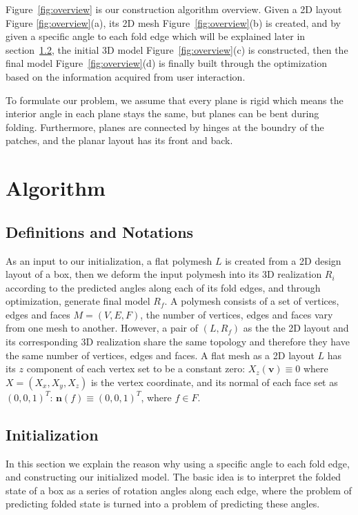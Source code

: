 \documentclass[submission]{gmp2018}
\begin{document}
Figure~\ref{fig:overview} is our construction algorithm overview. Given a 2D layout Figure \ref{fig:overview}(a), its 2D mesh Figure~\ref{fig:overview}(b) is created, and by given a specific angle to each fold edge which will be explained later in section~\ref{sec:initialization}, the initial 3D model Figure~\ref{fig:overview}(c) is constructed, then the final model Figure~\ref{fig:overview}(d) is finally built through the optimization based on the information acquired from user interaction.

To formulate our problem, we assume that every plane is rigid which means the interior angle in each plane stays the same, but planes can be bent during folding. Furthermore, planes are connected by hinges at the boundry of the patches, and the planar layout has its front and back.


\section{Algorithm}\label{sec:optimization}
\subsection{Definitions and Notations}
As an input to our initialization, a flat polymesh $L$ is created from a 2D design layout of a box, then we deform the input polymesh into its 3D realization $R_i$ according to the predicted angles along each of its fold edges, and through optimization, generate final model $R_f$. A polymesh consists of a set of vertices, edges and faces $M = (V,E,F)$, the number of vertices, edges and faces vary from one mesh to another. However, a pair of $(L,R_f)$ as the the 2D layout and its corresponding 3D realization share the same topology and therefore they have the same number of vertices, edges and faces. A flat mesh as a 2D layout $L$ has its $z$ component of each vertex set to be a constant zero: $X_z(\mathbf{v}) \equiv 0$ where $X = (X_x,X_y,X_z)$ is the vertex coordinate, and its normal of each face set as $(0,0,1)^T$: $\mathbf{n}(f) \equiv (0,0,1)^T$, where $f \in F$.

\subsection{Initialization}\label{sec:initialization}
In this section we explain the reason why using a specific angle to each fold edge, and constructing our initialized model. The basic idea is to interpret the folded state of a box as a series of rotation angles along each edge, where the problem of predicting folded state is turned into a problem of predicting these angles.
\end{document}
